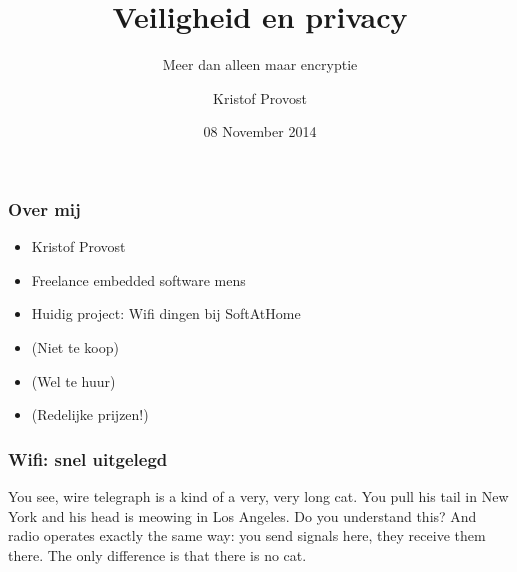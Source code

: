 \documentclass{beamer}
\title{Veiligheid en privacy}
\subtitle{Meer dan alleen maar encryptie}
\author{Kristof Provost}
\date{08 November 2014}
\begin{document}
  \frame{\titlepage}

  \begin{frame}
    \frametitle{Over mij}
    \begin{itemize}
      \item Kristof Provost
      \item Freelance embedded software mens
      \item Huidig project: Wifi dingen bij SoftAtHome
        \pause
      \item (Niet te koop)
        \pause
      \item (Wel te huur)
        \pause
      \item (Redelijke prijzen!)
    \end{itemize}
  \end{frame}

  \begin{frame}
    \frametitle{Wifi: snel uitgelegd}
    You see, wire telegraph is a kind of a very, very long cat.  You pull his
    tail in New York and his head is meowing in Los Angeles.  Do you understand
    this? And radio operates exactly the same way: you send signals here, they
    receive them there.  The only difference is that there is no cat.
  \end{frame}
\end{document}
